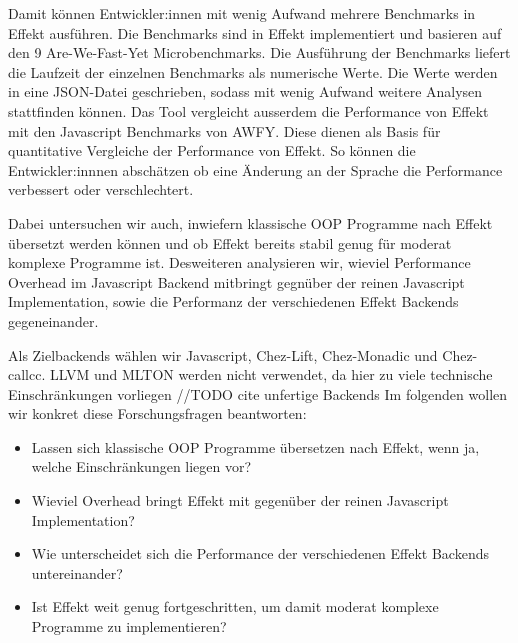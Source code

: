 Damit können Entwickler:innen mit wenig Aufwand mehrere Benchmarks in Effekt ausführen.
Die Benchmarks sind in Effekt implementiert und basieren auf den 9 Are-We-Fast-Yet Microbenchmarks.
Die Ausführung der Benchmarks liefert die Laufzeit der einzelnen Benchmarks als numerische Werte. Die Werte werden in eine JSON-Datei geschrieben, sodass mit wenig Aufwand weitere Analysen stattfinden können.
Das Tool vergleicht ausserdem die Performance von Effekt mit den Javascript Benchmarks von AWFY. Diese dienen als Basis für quantitative Vergleiche der Performance von Effekt.
So können die Entwickler:innnen abschätzen ob eine Änderung an der Sprache die Performance verbessert oder verschlechtert.

\medskip
Dabei untersuchen wir auch, inwiefern klassische OOP Programme nach Effekt übersetzt werden können und ob Effekt bereits stabil genug für moderat komplexe Programme ist.  
Desweiteren analysieren wir, wieviel Performance Overhead im Javascript Backend mitbringt gegnüber der reinen Javascript Implementation, sowie die Performanz der verschiedenen Effekt Backends gegeneinander.

\medskip
Als Zielbackends wählen wir Javascript, Chez-Lift, Chez-Monadic und Chez-callcc.
LLVM und MLTON werden nicht verwendet, da hier zu viele technische Einschränkungen vorliegen //TODO cite unfertige Backends
\medskip
Im folgenden wollen wir konkret diese Forschungsfragen beantworten:
\begin{itemize}
    \item Lassen sich klassische OOP Programme übersetzen nach Effekt, wenn ja, welche Einschränkungen liegen vor?
    \item Wieviel Overhead bringt Effekt mit gegenüber der reinen Javascript Implementation?
    \item Wie unterscheidet sich die Performance der verschiedenen Effekt Backends untereinander?
    \item Ist Effekt weit genug fortgeschritten, um damit moderat komplexe Programme zu implementieren?
\end{itemize}


  